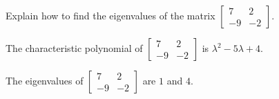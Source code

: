 
\begin{exerciseStatement}


Explain how to find the eigenvalues of the matrix \( \left[\begin{array}{cc}
7 & 2 \\
-9 & -2
\end{array}\right] \).


\end{exerciseStatement}
    
\begin{exerciseAnswer} 


The characteristic polynomial of \( \left[\begin{array}{cc}
7 & 2 \\
-9 & -2
\end{array}\right] \) is \( \lambda^{2} - 5 \lambda + 4 \).



The eigenvalues of \( \left[\begin{array}{cc}
7 & 2 \\
-9 & -2
\end{array}\right] \) are \( 1 \) and \( 4 \).


\end{exerciseAnswer}
    
